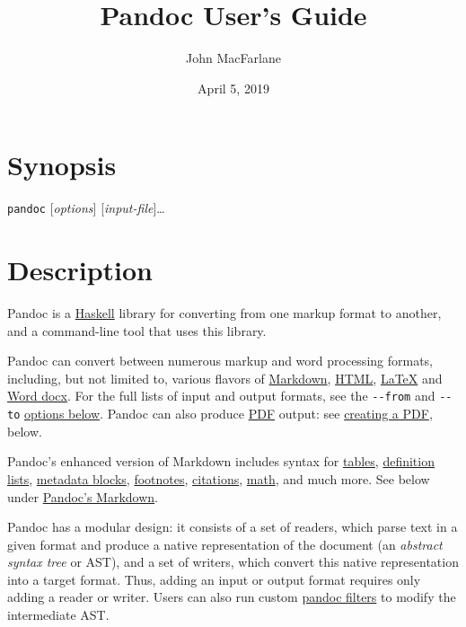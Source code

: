 \documentclass[
]{article}
\title{Pandoc User's Guide}
\author{John MacFarlane}
\date{April 5, 2019}
\begin{document}
\maketitle

\hypertarget{synopsis}{%
\section{Synopsis}\label{synopsis}}

\texttt{pandoc} {[}\emph{options}{]} {[}\emph{input-file}{]}\ldots{}

\hypertarget{description}{%
\section{Description}\label{description}}

Pandoc is a \href{https://www.haskell.org}{Haskell} library for
converting from one markup format to another, and a command-line tool
that uses this library.

Pandoc can convert between numerous markup and word processing formats,
including, but not limited to, various flavors of
\href{http://daringfireball.net/projects/markdown/}{Markdown},
\href{http://www.w3.org/html/}{HTML},
\href{http://latex-project.org}{LaTeX} and
\href{https://en.wikipedia.org/wiki/Office_Open_XML}{Word docx}. For the
full lists of input and output formats, see the \texttt{-\/-from} and
\texttt{-\/-to} \protect\hyperlink{general-options}{options below}.
Pandoc can also produce \href{https://www.adobe.com/pdf/}{PDF} output:
see \protect\hyperlink{creating-a-pdf}{creating a PDF}, below.

Pandoc's enhanced version of Markdown includes syntax for
\protect\hyperlink{tables}{tables},
\protect\hyperlink{definition-lists}{definition lists},
\protect\hyperlink{metadata-blocks}{metadata blocks},
\protect\hyperlink{footnotes}{footnotes},
\protect\hyperlink{citations}{citations},
\protect\hyperlink{math}{math}, and much more. See below under
\protect\hyperlink{pandocs-markdown}{Pandoc's Markdown}.

Pandoc has a modular design: it consists of a set of readers, which
parse text in a given format and produce a native representation of the
document (an \emph{abstract syntax tree} or AST), and a set of writers,
which convert this native representation into a target format. Thus,
adding an input or output format requires only adding a reader or
writer. Users can also run custom
\href{http://pandoc.org/filters.html}{pandoc filters} to modify the
intermediate AST.
\end{document}
